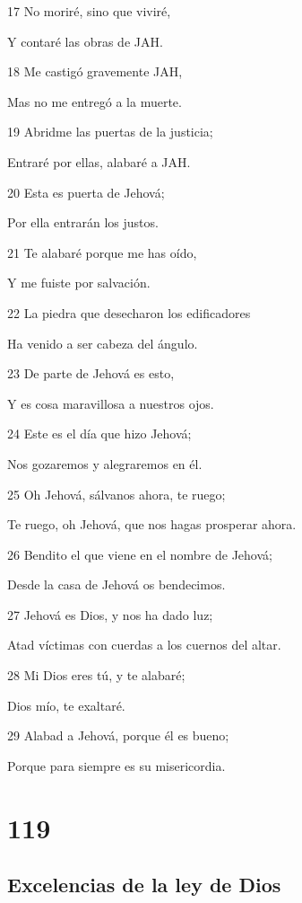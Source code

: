 \par 17 No moriré, sino que viviré,
\par Y contaré las obras de JAH.
\par 18 Me castigó gravemente JAH,
\par Mas no me entregó a la muerte.
\par 19 Abridme las puertas de la justicia;
\par Entraré por ellas, alabaré a JAH.
\par 20 Esta es puerta de Jehová;
\par Por ella entrarán los justos.
\par 21 Te alabaré porque me has oído,
\par Y me fuiste por salvación.
\par 22 La piedra que desecharon los edificadores
\par Ha venido a ser cabeza del ángulo.
\par 23 De parte de Jehová es esto,
\par Y es cosa maravillosa a nuestros ojos.
\par 24 Este es el día que hizo Jehová;
\par Nos gozaremos y alegraremos en él.
\par 25 Oh Jehová, sálvanos  ahora, te ruego;
\par Te ruego, oh Jehová, que nos hagas prosperar ahora.
\par 26 Bendito el que viene en el nombre de Jehová;
\par Desde la casa de Jehová os bendecimos.
\par 27 Jehová es Dios, y nos ha dado luz;
\par Atad víctimas con cuerdas a los cuernos del altar.
\par 28 Mi Dios eres tú, y te alabaré;
\par Dios mío, te exaltaré.
\par 29 Alabad a Jehová, porque él es bueno;
\par Porque para siempre es su misericordia.

\chapter{119}

\section*{Excelencias de la ley de Dios}

